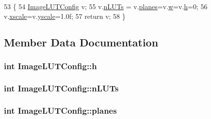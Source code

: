 \begin{DoxyCode}
53                                   \{
54         \hyperlink{struct_image_l_u_t_config}{ImageLUTConfig} v;
55         v.\hyperlink{struct_image_l_u_t_config_ab441a37dad64016dcb53341011197c67}{nLUTs} = v.\hyperlink{struct_image_l_u_t_config_a72137ca4186a2909e2ecbcb7ea7b5f01}{planes}=v.\hyperlink{struct_image_l_u_t_config_a3ec6c4f9e7f8774031877239a7b4872a}{w}=v.\hyperlink{struct_image_l_u_t_config_a082d23e44f6d443a44a4a147becb499b}{h}=0;
56         v.\hyperlink{struct_image_l_u_t_config_a6acaec2b516bb387269973af678c9b6d}{xscale}=v.\hyperlink{struct_image_l_u_t_config_ac335be6537d81d7069a5f383c2bef603}{yscale}=1.0f;
57         \textcolor{keywordflow}{return} v;
58     \}
\end{DoxyCode}


\subsection{Member Data Documentation}
\subsubsection[{\texorpdfstring{h}{h}}]{\setlength{\rightskip}{0pt plus 5cm}int Image\+L\+U\+T\+Config\+::h}\hypertarget{struct_image_l_u_t_config_a082d23e44f6d443a44a4a147becb499b}{}\label{struct_image_l_u_t_config_a082d23e44f6d443a44a4a147becb499b}
\subsubsection[{\texorpdfstring{n\+L\+U\+Ts}{nLUTs}}]{\setlength{\rightskip}{0pt plus 5cm}int Image\+L\+U\+T\+Config\+::n\+L\+U\+Ts}\hypertarget{struct_image_l_u_t_config_ab441a37dad64016dcb53341011197c67}{}\label{struct_image_l_u_t_config_ab441a37dad64016dcb53341011197c67}
\subsubsection[{\texorpdfstring{planes}{planes}}]{\setlength{\rightskip}{0pt plus 5cm}int Image\+L\+U\+T\+Config\+::planes}\hypertarget{struct_image_l_u_t_config_a72137ca4186a2909e2ecbcb7ea7b5f01}{}\label{struct_image_l_u_t_config_a72137ca4186a2909e2ecbcb7ea7b5f01}
